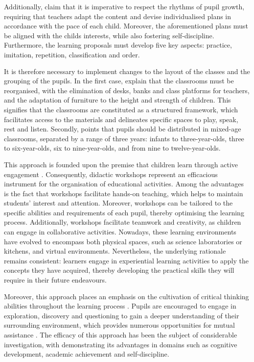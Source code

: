 Additionally, \textcite{pla2007} claim that it is imperative
to respect the rhythms of pupil growth, requiring that teachers adapt
the content and devise individualised plans in accordance with the pace
of each child. Moreover, the aforementioned plans must be aligned with
the child\textquotesingle s interests, while also fostering
self-discipline. Furthermore, the learning proposals must develop five
key aspects: practice, imitation, repetition, classification and order.

It is therefore necessary to implement changes to the layout of the
classes and the grouping of the pupils. In the first case, \textcite{pla2007} explain that the classrooms must be reorganised, with the
elimination of desks, banks and class platforms for teachers, and the
adaptation of furniture to the height and strength of children. This
signifies that the classrooms are constituted as a structured framework,
which facilitates access to the materials and delineates specific spaces
to play, speak, rest and listen. Secondly, \textcite{lillard2013playful} points that
pupils should be distributed in mixed-age classrooms, separated by a
range of three years: infants to three-year-olds, three to
six-year-olds, six to nine-year-olds, and from nine to twelve-year-olds.

This approach is founded upon the premise that children learn through
active engagement \cite{pla2007}. Consequently, didactic
workshops represent an efficacious instrument for the organisation of
educational activities. Among the advantages is the fact that workshops
facilitate hands-on teaching, which helps to maintain
students' interest and attention. Moreover, workshops
can be tailored to the specific abilities and requirements of each
pupil, thereby optimising the learning process. Additionally, workshops
facilitate teamwork and creativity, as children can engage in
collaborative activities. Nowadays, these learning environments have
evolved to encompass both physical spaces, such as science laboratories
or kitchens, and virtual environments. Nevertheless, the underlying
rationale remains consistent: learners engage in experiential learning
activities to apply the concepts they have acquired, thereby developing
the practical skills they will require in their future endeavours.

Moreover, this approach places an emphasis on the cultivation of
critical thinking abilities throughout the learning process \cite{murray2011montessori}. Pupils are encouraged to engage in exploration, discovery and
questioning to gain a deeper understanding of their surrounding
environment, which provides numerous opportunities for mutual assistance
\cite{pla2007}. The efficacy of this approach has been the
subject of considerable investigation, with \cite{lillard2013playful} demonstrating
its advantages in domains such as cognitive development, academic
achievement and self-discipline.


